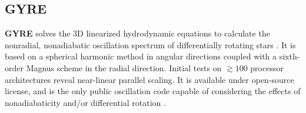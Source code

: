    
    
    
{\color{brown}    
\subsection{GYRE}}
  
\textbf{GYRE} solves the 3D linearized hydrodynamic
equations to calculate the nonradial, nonadiabatic oscillation
spectrum of differentially rotating stars \citep{bard11}. It is based
on a spherical harmonic method in angular directions coupled with a
sixth-order Magnus scheme in the radial direction. Initial tests on
$\gtrsim 100$ processor architectures reveal near-linear parallel
scaling. It is available under open-source license, and is the only public oscillation code capable of
considering the effects of nonadiabaticity and/or differential
rotation \citep{Townsend_2013}.

    
